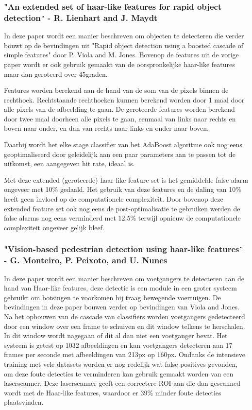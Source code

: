 \documentclass[]{article}
\begin{document}
\subsubsection*{"An extended set of haar-like features for rapid object detection$"$ - R. Lienhart and J. Maydt}
In deze paper wordt een manier beschreven om objecten te detecteren die verder bouwt op de bevindingen uit "Rapid object detection using a boosted cascade of simple features" door P. Viola and M. Jones. Bovenop de features uit de vorige paper wordt er ook gebruik gemaakt van de oorspronkelijke haar-like features maar dan geroteerd over 45graden.
\par
Features worden berekend aan de hand van de som van de pixels binnen de rechthoek. Rechtstaande rechthoeken kunnen berekend worden door 1 maal door alle pixels van de afbeelding te gaan. De geroteerde features worden berekend door twee maal doorheen alle pixels te gaan, eenmaal van links naar rechts en boven naar onder, en dan van rechts naar links en onder naar boven.
\par
Daarbij wordt het elke stage classifier van het AdaBoost algoritme ook nog eens geoptimaliseerd door geleidelijk aan een paar parameters aan te passen tot de uitkomst, een aangegeven hit rate, ideaal is.
\par
Met deze extended (geroteerde) haar-like feature set is het gemiddelde false alarm ongeveer met 10\% gedaald. Het gebruik van deze features en de daling van 10\% heeft geen invloed op de computationele complexiteit. Door bovenop deze extended feature set ook nog eens de post-optimalisatie te gebruiken werden de false alarms nog eens verminderd met 12.5\% terwijl opnieuw de computationele complexiteit ongeveer gelijk bleef.
\subsubsection*{"Vision-based pedestrian detection using haar-like features$"$ - G. Monteiro, P. Peixoto, and U. Nunes}
In deze paper wordt een manier beschreven om voetgangers te detecteren aan de hand van Haar-like features, deze detectie is een module in een groter systeem gebruikt om botsingen te voorkomen bij traag bewegende voertuigen. De bevindingen in deze paper bouwen verder op bevindingen van Viola and Jones.
Na het opbouwen van de cascade van classifiers worden voetgangers gedetecteerd door een window over een frame te schuiven en dit window telkens te herschalen. In dit window wordt nagegaan of dit al dan niet een voetganger bevat.
Het systeem is getest op 1032 afbeeldingen en kan voetgangers detecteren aan 17 frames per seconde met afbeeldingen van 213px op 160px. Ondanks de intensieve training met vele datasets worden er nog redelijk wat false positives gevonden, om deze foute detecties te verminderen kan gebruik gemaakt worden van een laserscanner. Deze laserscanner geeft een correctere ROI aan die dan gescanned wordt met de Haar-like features, waardoor er 39\% minder foute detecties plaatsvinden.
\end{document}
